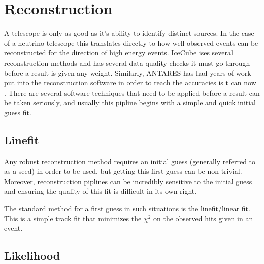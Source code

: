 \chapter{Reconstruction}

A telescope is only as good as it's ability to identify distinct sources. In the case of a neutrino telescope this translates directly to how well observed events can be reconstructed for the direction of high energy events. IceCube ises several reconstruction methods \cite{icecube} and has several data quality checks it must go through before a result is given any weight. Similarly, ANTARES has had years of work put into the reconstruction software in order to reach the accuracies is t can now \cite{antares}. There are several software techniques that need to be applied before a result can be taken seriously, and usually this pipline begins with a simple and quick initial guess fit. 

\section{Linefit}

Any robust reconstruction method requires an initial guess (generally referred to as a seed) in order to be used, but getting this first guess can be non-trivial. Moreover, reconstruction piplines can be incredibly sensitive to the initial guess and ensuring the quality of this fit is difficult in its own right.

The standard method for a first guess in such situations is the linefit/linear fit. This is a simple track fit that minimizes the $\chi^{2}$ on the observed hits given in an event. 


\section{Likelihood}

